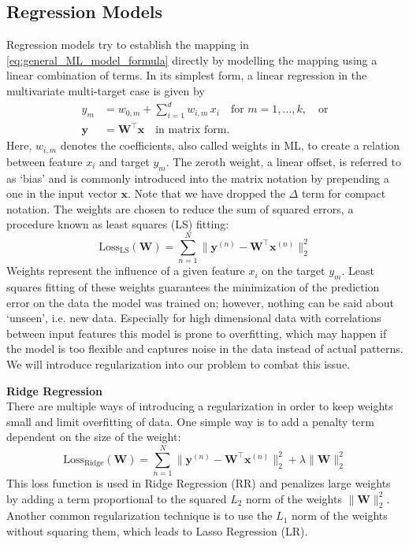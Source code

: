 \subsection{Regression Models}
\label{subsec:background_ml_model_types}
Regression models try to establish the mapping in \autoref{eq:general_ML_model_formula} directly by modelling the mapping using a linear combination of terms. In its simplest form, a linear regression in the multivariate multi-target case is given by 
\begin{equation}
    \label{eq:linear_regression_formula}
    \begin{aligned}
        y_m &= w_{0, m} + \sum_{i=1}^d w_{i,m} \, x_i \quad \text{for } m = 1, \dots, k, \quad \text{or}\\
        \mathbf{y} &= \mathbf{W^\top} \mathbf{x} \quad \text{in matrix form}.
    \end{aligned}
\end{equation}
Here, $w_{i,m}$ denotes the coefficients, also called weights in ML, to create a relation between feature $x_i$ and target $y_m$. The zeroth weight, a linear offset, is referred to as `bias' and is commonly introduced into the matrix notation by prepending a one in the input vector $\mathbf{x}$. Note that we have dropped the $\Delta$ term for compact notation. The weights are chosen to reduce the sum of squared errors, a procedure known as least squares (LS) fitting: 
\begin{equation}
    \label{eq:least_squares_error}
    \text{Loss}_\text{LS}(\mathbf{W}) = \sum_{n=1}^{N}\|\mathbf{y}^{(n)} - \mathbf{W^\top} \mathbf{x}^{(n)}\|_2^2
\end{equation}
Weights represent the influence of a given feature $x_i$ on the target $y_m$. Least squares fitting of these weights guarantees the minimization of the prediction error on the data the model was trained on; however, nothing can be said about `unseen', i.e. new data. Especially for high dimensional data with correlations between input features this model is prone to overfitting, which may happen if the model is too flexible and captures noise in the data instead of actual patterns. We will introduce regularization into our problem to combat this issue.

\textbf{Ridge Regression}\\
There are multiple ways of introducing a regularization in order to keep weights small and limit overfitting of data. One simple way is to add a penalty term dependent on the size of the weight: 
\begin{equation}
    \label{eq:regularized_least_squares_error}
    \text{Loss}_\text{Ridge}(\mathbf{W}) = \sum_{n=1}^{N}\|\mathbf{y}^{(n)} - \mathbf{W^\top} \mathbf{x}^{(n)}\|_2^2 + \lambda \|\mathbf{W}\|_2^2
\end{equation}
This loss function is used in Ridge Regression (RR) and penalizes large weights by adding a term proportional to the squared $L_2$ norm of the weights $\|\mathbf{W}\|_2^2$. Another common regularization technique is to use the $L_1$ norm of the weights without squaring them, which leads to Lasso Regression (LR). 

